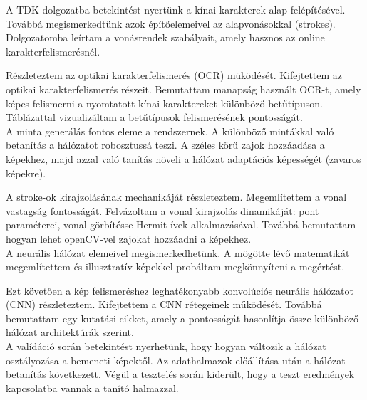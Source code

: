 
A TDK dolgozatba betekintést nyertünk a kínai karakterek alap felépítésével. Továbbá megismerkedtünk azok építőelemeivel az alapvonásokkal (strokes). Dolgozatomba leírtam a vonásrendek szabályait, amely hasznos az online karakterfelismerésnél.

Részleteztem az optikai karakterfelismerés (OCR) müködését. Kifejtettem az optikai karakterfelismerés részeit. Bemutattam manapság használt OCR-t, amely képes felismerni a nyomtatott kínai karaktereket különböző betűtípuson. Táblázattal vizualizáltam a betűtípusok felismerésének pontosságát.\\

A minta generálás fontos eleme a rendszernek. A különböző mintákkal való betanítás a hálózatot robosztussá teszi. A széles körű zajok hozzáadása a képekhez, majd azzal való tanítás növeli a hálózat adaptációs képességét (zavaros képekre).

A stroke-ok kirajzolásának mechanikáját részleteztem. Megemlítettem a vonal vastagság fontosságát. Felvázoltam a vonal kirajzolás dinamikáját: pont paraméterei, vonal görbítésse Hermit ívek alkalmazásával. Továbbá bemutattam hogyan lehet openCV-vel zajokat hozzáadni a képekhez.\\

A neurális hálózat elemeivel megismerkedhetünk. A mögötte lévő matematikát megemlítettem és illusztratív képekkel probáltam megkönnyíteni a megértést.

Ezt követően a kép felismeréshez leghatékonyabb konvolúciós neurális hálózatot (CNN) részleteztem. Kifejtettem a CNN rétegeinek működését. Továbbá bemutattam egy kutatási cikket, amely a pontosságát hasonlítja össze különböző hálózat architektúrák szerint.\\

A valídáció során betekintést nyerhetünk, hogy hogyan változik a hálózat osztályozása a bemeneti képektől. Az adathalmazok előállítása után a hálózat betanítás következett. Végül a tesztelés során kiderült, hogy a teszt eredmények kapcsolatba vannak a tanító halmazzal.